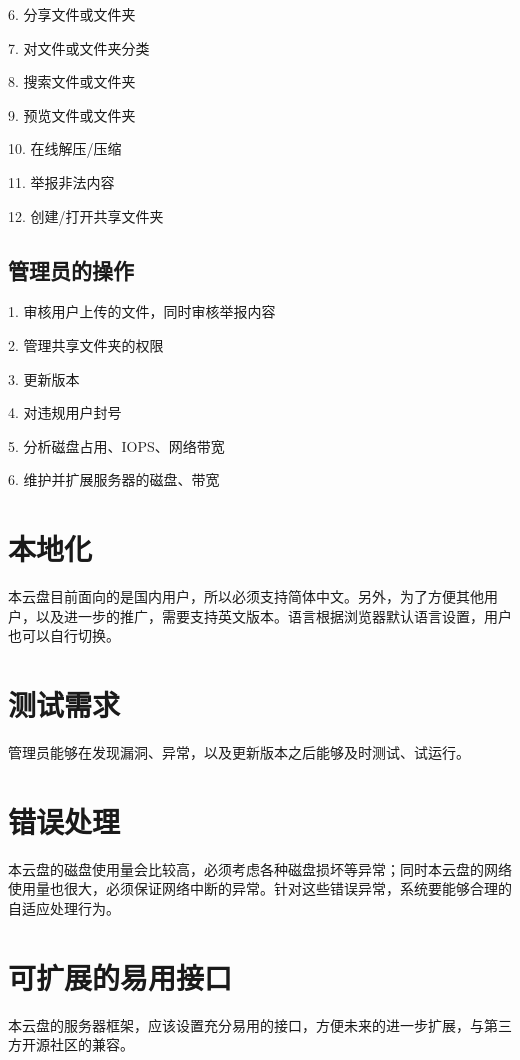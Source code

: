     6. 分享文件或文件夹

    7. 对文件或文件夹分类

    8. 搜索文件或文件夹

    9. 预览文件或文件夹

    10. 在线解压/压缩

    11. 举报非法内容

    12. 创建/打开共享文件夹

\subsection{管理员的操作}

    1. 审核用户上传的文件，同时审核举报内容

    2. 管理共享文件夹的权限

    3. 更新版本

    4. 对违规用户封号

    5. 分析磁盘占用、IOPS、网络带宽

    6. 维护并扩展服务器的磁盘、带宽

\section{本地化}

本云盘目前面向的是国内用户，所以必须支持简体中文。另外，为了方便其他用户，以及进一步的推广，需要支持英文版本。语言根据浏览器默认语言设置，用户也可以自行切换。

\section{测试需求}
管理员能够在发现漏洞、异常，以及更新版本之后能够及时测试、试运行。

\section{错误处理}
本云盘的磁盘使用量会比较高，必须考虑各种磁盘损坏等异常；同时本云盘的网络使用量也很大，必须保证网络中断的异常。针对这些错误异常，系统要能够合理的自适应处理行为。

\section{可扩展的易用接口}
本云盘的服务器框架，应该设置充分易用的接口，方便未来的进一步扩展，与第三方开源社区的兼容。

